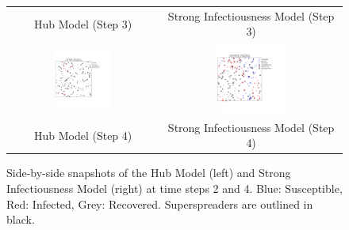 \documentclass{article}
\begin{document}
\begin{figure}[!htbp]
\begin{tabular}{cc}
        Hub Model (Step 3) & Strong Infectiousness Model (Step 3) \\
        \includegraphics[width=0.4\textwidth]{fig/sir_hub_step_4.png} &
        \includegraphics[width=0.4\textwidth]{fig/sir_strong_step_4.png} \\
        Hub Model (Step 4) & Strong Infectiousness Model (Step 4) \\
    \end{tabular}
    \caption{Side-by-side snapshots of the Hub Model (left) and Strong Infectiousness Model (right) at time steps 2 and 4. Blue: Susceptible, Red: Infected, Grey: Recovered. Superspreaders are outlined in black.}
    \label{fig:side_by_side_snapshots_2}
\end{figure}
\end{document}
